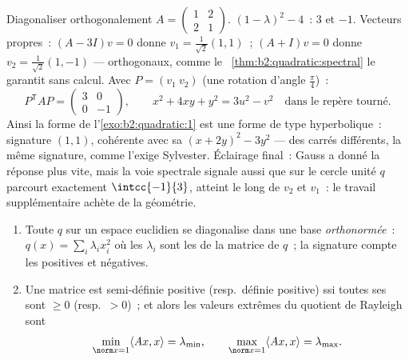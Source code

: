 \begin{example}\label{ex:b2:quadratic:fullrun}
Diagonaliser orthogonalement $A = \begin{pmatrix} 1 & 2\\ 2 &
1\end{pmatrix}$.  $(1 - \lambda)^2 -
4$~:  $3$ et $-1$. Vecteurs propres~: $(A - 3I)v = 0$
donne $v_1 = \frac{1}{\sqrt2}(1,1)$~; $(A + I)v = 0$ donne $v_2
= \frac{1}{\sqrt2}(1,-1)$ --- orthogonaux, comme le~
\cref{thm:b2:quadratic:spectral} le garantit sans calcul. Avec $P =
(v_1\ v_2)$ (une rotation d'angle $\frac\pi4$)~:
\[
P^{\mathsf T}AP = \begin{pmatrix} 3 & 0\\ 0 & -1
\end{pmatrix},
\qquad
x^2 + 4xy + y^2 = 3u^2 - v^2
\quad\text{dans le repère tourné} .
\]
Ainsi la forme de l'\cref{exo:b2:quadratic:1} est une forme de type
hyperbolique~: signature $(1,1)$, cohérente avec sa  $(x + 2y)^2 - 3y^2$ --- des carrés différents, la même
signature, comme l'exige Sylvester. Éclairage final~: Gauss a donné
la réponse plus vite, mais la voie spectrale signale aussi que sur
le cercle unité $q$ parcourt exactement $\intcc{-1}{3}$, atteint le
long de $v_2$ et $v_1$~: le travail supplémentaire achète de la
géométrie.
\end{example}

\begin{corollary}\label{cor:b2:quadratic:principalaxes}
\begin{enumerate}
  \item Toute  $q$ sur un espace euclidien se
        diagonalise dans une base \emph{orthonormée}~: $q(x) =
        \sum_i \lambda_i x_i^2$ où les $\lambda_i$ sont les  de la matrice  de $q$~; la signature
        compte les  positives et négatives.
  \item Une matrice  est semi-définie positive (resp.\
        définie positive) ssi toutes ses  sont $\geq
        0$ (resp.\ $> 0$)~; et alors les valeurs extrêmes du
        quotient de Rayleigh sont
        \[
        \min_{\norm x = 1} \langle Ax, x\rangle = \lambda_{\min},
        \qquad
        \max_{\norm x = 1} \langle Ax, x\rangle = \lambda_{\max} .
        \]
\end{enumerate}
\end{corollary}

